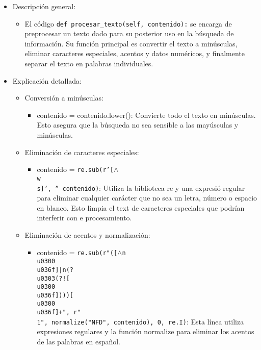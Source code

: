 \begin{itemize}
  \item Descripción general:
  \begin{itemize}
    \item El código \texttt{def procesar\_texto(self, contenido):} se encarga de preprocesar un texto dado para su posterior uso en la búsqueda de información. Su función principal es convertir el texto a minúsculas, eliminar caracteres especiales, acentos y datos numéricos, y finalmente separar el texto en palabras individuales.
  \end{itemize}
  \item Explicación detallada:
  \begin{itemize}
    \item Conversión a minúsculas:
    \begin{itemize}
      \item contenido = contenido.lower(): Convierte todo el texto en minúsculas. Esto asegura que la búsqueda no sea sensible a las mayúsculas y minúsculas.
    \end{itemize}
    \item Eliminación de caracteres especiales:
    \begin{itemize}
      \item contenido = \texttt{re.sub(r'[$\land$\\w\\s]', '' contenido)}: Utiliza la biblioteca re y una expresió regular para eliminar cualquier carácter que no sea un letra, número o espacio en blanco. Esto limpia el text de caracteres especiales que podrían interferir con e procesamiento.
    \end{itemize}
    \item Eliminación de acentos y normalización:
    \begin{itemize}
      \item contenido = \texttt{re.sub(r"([$\land$n\\u0300\-\\u036f]|n(?\!\\u0303(?![\\u0300\-\\u036f])))[\\u0300\-\\u036f]+", r"\\1", {normalize("NFD", contenido)}, 0, re.I)}: Esta línea utiliza expresiones regulares y la función normalize para eliminar los acentos de las palabras en español.
    \end{itemize}

\end{itemize}
\end{itemize}
